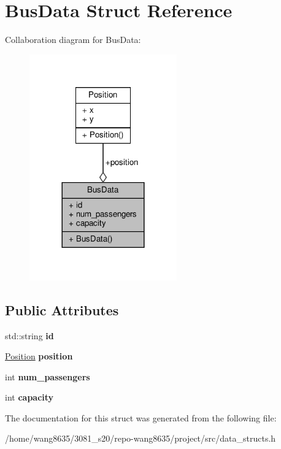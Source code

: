 \hypertarget{structBusData}{}\section{Bus\+Data Struct Reference}
\label{structBusData}


Collaboration diagram for Bus\+Data\+:
\nopagebreak
\begin{figure}[H]
\begin{center}
\leavevmode
\includegraphics[width=180pt]{structBusData__coll__graph}
\end{center}
\end{figure}
\subsection*{Public Attributes}
\begin{DoxyCompactItemize}
\item 
\mbox{\label{structBusData_aaae4f1be20f1ee54bb4dd773b8580069}} 
std\+::string {\bfseries id}
\item 
\mbox{\label{structBusData_ae56b05c0d23a89ced4a0333bd65f0c96}} 
\hyperlink{structPosition}{Position} {\bfseries position}
\item 
\mbox{\label{structBusData_a4293fd5e2ffdcdd1b02a9e56f27230ec}} 
int {\bfseries num\+\_\+passengers}
\item 
\mbox{\label{structBusData_a84ea609f6ecc9b96e1ce37b47d2127a1}} 
int {\bfseries capacity}
\end{DoxyCompactItemize}


The documentation for this struct was generated from the following file\+:\begin{DoxyCompactItemize}
\item 
/home/wang8635/3081\+\_\+s20/repo-\/wang8635/project/src/data\+\_\+structs.\+h\end{DoxyCompactItemize}
